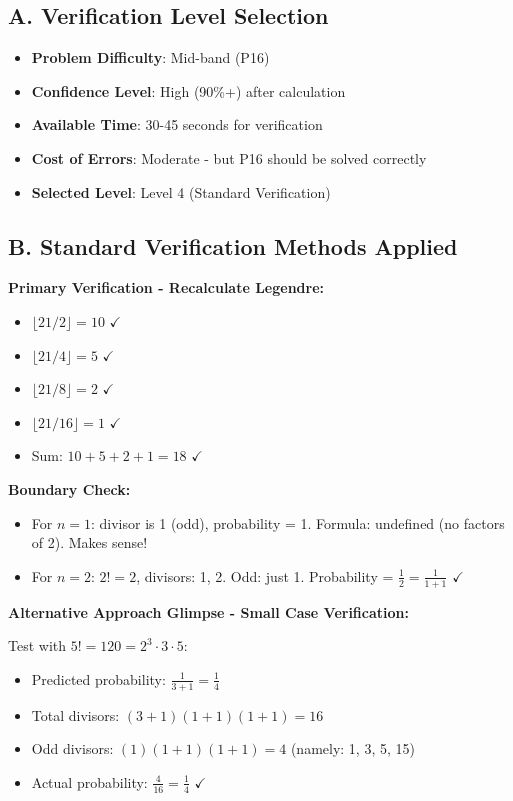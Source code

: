 \documentclass[]{article}
\begin{document}
\begin{verificationbox}
\subsection*{A. Verification Level Selection}
\begin{itemize}[leftmargin=*]
    \item \textbf{Problem Difficulty}: Mid-band (P16)
    \item \textbf{Confidence Level}: High (90\%+) after calculation
    \item \textbf{Available Time}: 30-45 seconds for verification
    \item \textbf{Cost of Errors}: Moderate - but P16 should be solved correctly
    \item \textbf{Selected Level}: Level 4 (Standard Verification)
\end{itemize}

\subsection*{B. Standard Verification Methods Applied}

\textbf{Primary Verification - Recalculate Legendre:}
\begin{itemize}[leftmargin=*]
    \item $\lfloor 21/2 \rfloor = 10$ $\checkmark$
    \item $\lfloor 21/4 \rfloor = 5$ $\checkmark$
    \item $\lfloor 21/8 \rfloor = 2$ $\checkmark$
    \item $\lfloor 21/16 \rfloor = 1$ $\checkmark$
    \item Sum: $10 + 5 + 2 + 1 = 18$ $\checkmark$
\end{itemize}

\textbf{Boundary Check:}
\begin{itemize}[leftmargin=*]
    \item For $n=1$: divisor is 1 (odd), probability = 1. Formula: undefined (no factors of 2). Makes sense!
    \item For $n=2$: $2! = 2$, divisors: 1, 2. Odd: just 1. Probability = $\frac{1}{2} = \frac{1}{1+1}$ $\checkmark$
\end{itemize}

\textbf{Alternative Approach Glimpse - Small Case Verification:}

Test with $5! = 120 = 2^3 \cdot 3 \cdot 5$:
\begin{itemize}[leftmargin=*]
    \item Predicted probability: $\frac{1}{3+1} = \frac{1}{4}$
    \item Total divisors: $(3+1)(1+1)(1+1) = 16$
    \item Odd divisors: $(1)(1+1)(1+1) = 4$ (namely: 1, 3, 5, 15)
    \item Actual probability: $\frac{4}{16} = \frac{1}{4}$ $\checkmark$
\end{itemize}


\end{verificationbox}
\end{document}

